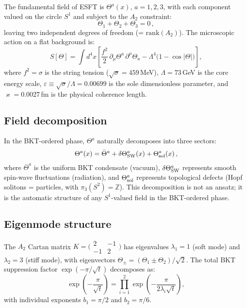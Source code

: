 \documentclass[twocolumn,preprintnumbers,amsmath,amssymb,prd]{revtex4-2}
\begin{document}
The fundamental field of ESFT is $\Theta^a(x)$, $a = 1,2,3$, with each component valued on the circle $S^1$ and subject to the $A_2$ constraint:
\begin{equation}
\Theta_1 + \Theta_2 + \Theta_3 = 0\,,
\label{eq:A2constraint}
\end{equation}
leaving two independent degrees of freedom (= $\mathrm{rank}(A_2)$).
The microscopic action on a flat background is:
\begin{equation}
S[\Theta] = \int d^4x\left[\frac{f^2}{2}\,\partial_\mu\Theta^a\,\partial^\mu\Theta_a - \Lambda^4\bigl(1 - \cos|\Theta|\bigr)\right],
\label{eq:action}
\end{equation}
where $f^2 = \sigma$ is the string tension ($\sqrt{\sigma} = 459\,$MeV), $\Lambda = 73\,$GeV is the core energy scale, $\varepsilon \equiv \sqrt{\sigma}/\Lambda = 0.00699$ is the sole dimensionless parameter, and $\varkappa = 0.0027\,$fm is the physical coherence length.

\subsection{Field decomposition}

In the BKT-ordered phase, $\Theta^a$ naturally decomposes into three sectors:
\begin{equation}
\Theta^a(x) = \bar{\Theta}^a + \delta\Theta^a_{\rm SW}(x) + \Theta^a_{\rm sol}(x)\,,
\end{equation}
where $\bar{\Theta}^a$ is the uniform BKT condensate (vacuum), $\delta\Theta^a_{\rm SW}$ represents smooth spin-wave fluctuations (radiation), and $\Theta^a_{\rm sol}$ represents topological defects (Hopf solitons = particles, with $\pi_3(S^2) = \mathbb{Z}$).
This decomposition is not an ansatz; it is the automatic structure of any $S^1$-valued field in the BKT-ordered phase.

\subsection{Eigenmode structure}

The $A_2$ Cartan matrix $K = \bigl(\begin{smallmatrix}2 & -1\\ -1 & 2\end{smallmatrix}\bigr)$ has eigenvalues $\lambda_1 = 1$ (soft mode) and $\lambda_2 = 3$ (stiff mode), with eigenvectors $\Theta_\pm = (\Theta_1 \pm \Theta_2)/\sqrt{2}$.
The total BKT suppression factor $\exp(-\pi/\sqrt{t})$ decomposes as:
\begin{equation}
\exp\!\left(-\frac{\pi}{\sqrt{t}}\right) = \prod_{i=1}^{2}\exp\!\left(-\frac{\pi}{2\lambda_i\sqrt{t}}\right),
\end{equation}
with individual exponents $b_1 = \pi/2$ and $b_2 = \pi/6$.
\end{document}
